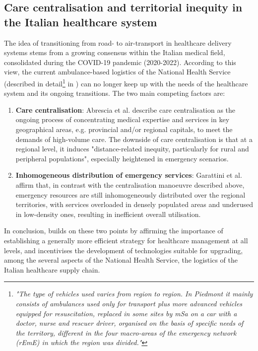 \subsection{Care centralisation and territorial inequity in the Italian healthcare system}\label{subsec:care-centralisation}
The idea of transitioning from road- to air-transport in healthcare delivery systems stems from a growing consensus within the Italian medical field, consolidated during the COVID-19 pandemic (2020-2022). According to this view, the current ambulance-based logistics of the National Health Service (described in detail\footnote{ \textit{"The type of vehicles used varies from region to region. In Piedmont it mainly consists of ambulances used only for transport plus more advanced vehicles equipped for resuscitation, replaced in some sites by mSa on a car with a doctor, nurse and rescuer driver, organised on the basis of specific needs of the territory, different in the four macro-areas of the emergency network (rEmE) in which the region was divided."}\cite{Fantato2023}} in \cite{Fantato2023}) can no longer keep up with the needs of the healthcare system and its ongoing transitions. The two main competing factors are:

\begin{enumerate}
    \item \textbf{Care centralisation}: Abrescia et al. \cite{Abrescia2026} describe care centralisation as the ongoing process of concentrating medical expertise and services in key geographical areas, e.g. provincial and/or regional capitals, to meet the demands of high-volume care. The downside of care centralisation is that at a regional level, it induces "distance-related inequity, particularly for rural and peripheral populations", especially heightened in emergency scenarios.
    \item \textbf{Inhomogeneous distribution of emergency services}: Garattini et al. \cite{Garattini2020} affirm that, in contrast with the centralisation manoeuvre described above, emergency resources are still inhomogeneously distributed over the regional territories, with services overloaded in densely populated areas and underused in low-density ones, resulting in inefficient overall utilisation.
\end{enumerate} 

In conclusion, \cite{Capuzzo2022} builds on these two points by affirming the importance of establishing a generally more efficient strategy for healthcare management at all levels, and incentivises the development of technologies suitable for upgrading, among the several aspects of the National Health Service, the logistics of the Italian healthcare supply chain. 


